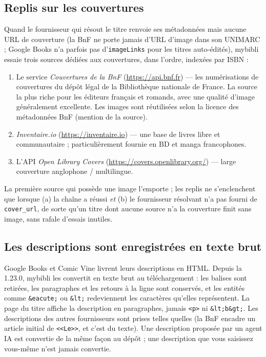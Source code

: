 \subsection*{Replis sur les couvertures}

Quand le fournisseur qui résout le titre renvoie ses métadonnées
mais aucune URL de couverture (la BnF ne porte jamais d'URL
d'image dans son UNIMARC ; Google Books n'a parfois pas
d'\texttt{imageLinks} pour les titres auto-édités), mybibli essaie
trois sources dédiées aux couvertures, dans l'ordre, indexées par
ISBN :

\begin{enumerate}
  \item Le service \emph{Couvertures de la BnF}
        (\url{https://api.bnf.fr}) — les numérisations de
        couvertures du dépôt légal de la Bibliothèque nationale de
        France. La source la plus riche pour les éditeurs français
        et romands, avec une qualité d'image généralement
        excellente. Les images sont réutilisées selon la licence
        des métadonnées BnF (mention de la source).
  \item \emph{Inventaire.io} (\url{https://inventaire.io}) — une
        base de livres libre et communautaire ; particulièrement
        fournie en BD et manga francophones.
  \item L'API \emph{Open Library Covers}
        (\url{https://covers.openlibrary.org/}) — large couverture
        anglophone / multilingue.
\end{enumerate}

La première source qui possède une image l'emporte ; les replis ne
s'enclenchent que lorsque (a) la chaîne a réussi \emph{et} (b) le
fournisseur résolvant n'a pas fourni de \texttt{cover\_url}, de
sorte qu'un titre dont aucune source n'a la couverture finit sans
image, sans rafale d'essais inutiles.

\subsection*{Les descriptions sont enregistrées en texte brut}

Google Books et Comic Vine livrent leurs descriptions en HTML. Depuis
la 1.23.0, mybibli les convertit en texte brut au téléchargement : les
balises sont retirées, les paragraphes et les retours à la ligne sont
conservés, et les entités comme \texttt{\&eacute;} ou \texttt{\&lt;}
redeviennent les caractères qu'elles représentent. La page du titre
affiche la description en paragraphes, jamais \texttt{<p>} ni
\texttt{\&lt;b\&gt;}. Les descriptions des autres fournisseurs sont
prises telles quelles (la BnF encadre un article initial de
\texttt{<<Le>>}, et c'est du texte). Une description proposée par un
agent IA est convertie de la même façon au dépôt ; une description que
vous saisissez vous-même n'est jamais convertie.

